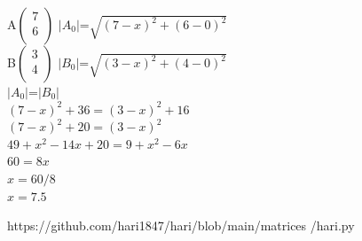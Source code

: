 \documentclass[10pt,a4paper]{report}
\begin{document}
\begin{multicols}{2}
A$\begin{pmatrix}
  7 \\
  6 \\
 \end{pmatrix}$  $|A_0|$=$\sqrt{(7-x)^2+(6-0)^2}$\\ \vspace{2mm}
B$\begin{pmatrix}
  3 \\
  4 \\
 \end{pmatrix}$  $|B_0|$=$\sqrt{(3-x)^2+(4-0)^2}$\\ \vspace{1.5mm}
$|A_0|$=$|B_0|$\\                             \vspace{2mm}
$(7-x)^2+36=(3-x)^2+16$\\                     \vspace{1.5mm}
$(7-x)^2+20=(3-x)^2$\\                        \vspace{1.5mm}
$49+x^2-14x+20=9+x^2-6x$\\                    \vspace{1.5mm}
$60=8x$\\                                     \vspace{1.5mm}
$x=60/8$\\                                    \vspace{1.5mm}
$x=7.5$                                       \vspace{1mm}

\begin{mdframed}
https://github.com/hari1847/hari/blob/main/matrices
/hari.py
\end{mdframed}

\end{multicols}
\end{document}
